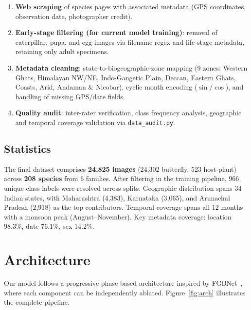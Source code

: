 \documentclass[10pt, twocolumn]{article}
\begin{document}
\begin{enumerate}[leftmargin=*, topsep=2pt, itemsep=1pt]
    \item \textbf{Web scraping} of species pages with associated metadata (GPS coordinates, observation date, photographer credit).
    \item \textbf{Early-stage filtering (for current model training)}: removal of caterpillar, pupa, and egg images via filename regex and life-stage metadata, retaining only adult specimens.
    \item \textbf{Metadata cleaning}: state-to-biogeographic-zone mapping (9 zones: Western Ghats, Himalayan NW/NE, Indo-Gangetic Plain, Deccan, Eastern Ghats, Coasts, Arid, Andaman \& Nicobar), cyclic month encoding ($\sin/\cos$), and handling of missing GPS/date fields.
    \item \textbf{Quality audit}: inter-rater verification, class frequency analysis, geographic and temporal coverage validation via \texttt{data\_audit.py}.
\end{enumerate}

\subsection{Statistics}
The final dataset comprises \textbf{24,825 images} (24,302 butterfly, 523 host-plant) across \textbf{208 species} from 6 families. After filtering in the training pipeline, 966 unique class labels were resolved across splits. Geographic distribution spans 34 Indian states, with Maharashtra (4,383), Karnataka (3,065), and Arunachal Pradesh (2,918) as the top contributors. Temporal coverage spans all 12 months with a monsoon peak (August--November). Key metadata coverage: location 98.3\%, date 76.1\%, sex 14.2\%.

\section{Architecture}
\label{sec:architecture}

Our model follows a progressive phase-based architecture inspired by FGBNet~\cite{yuan2025fgbnet}, where each component can be independently ablated. Figure~\ref{fig:arch} illustrates the complete pipeline.
\end{document}
